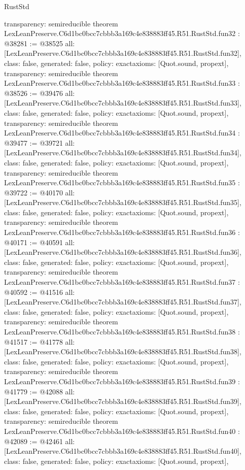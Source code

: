\begin{lexlean}{RustStd}
\begin{coremodule}
{  transparency: semireducible
}
theorem LexLeanPreserve.C6d1bc0bcc7cbbb3a169c4e838883ff45.R51.RustStd.fun32 : @38281 := @38525 {
  all: [LexLeanPreserve.C6d1bc0bcc7cbbb3a169c4e838883ff45.R51.RustStd.fun32],
  class: false,
  generated: false,
  policy: exact{axioms: [Quot.sound, propext]},
  transparency: semireducible
}
theorem LexLeanPreserve.C6d1bc0bcc7cbbb3a169c4e838883ff45.R51.RustStd.fun33 : @38526 := @39476 {
  all: [LexLeanPreserve.C6d1bc0bcc7cbbb3a169c4e838883ff45.R51.RustStd.fun33],
  class: false,
  generated: false,
  policy: exact{axioms: [Quot.sound, propext]},
  transparency: semireducible
}
theorem LexLeanPreserve.C6d1bc0bcc7cbbb3a169c4e838883ff45.R51.RustStd.fun34 : @39477 := @39721 {
  all: [LexLeanPreserve.C6d1bc0bcc7cbbb3a169c4e838883ff45.R51.RustStd.fun34],
  class: false,
  generated: false,
  policy: exact{axioms: [Quot.sound, propext]},
  transparency: semireducible
}
theorem LexLeanPreserve.C6d1bc0bcc7cbbb3a169c4e838883ff45.R51.RustStd.fun35 : @39722 := @40170 {
  all: [LexLeanPreserve.C6d1bc0bcc7cbbb3a169c4e838883ff45.R51.RustStd.fun35],
  class: false,
  generated: false,
  policy: exact{axioms: [Quot.sound, propext]},
  transparency: semireducible
}
theorem LexLeanPreserve.C6d1bc0bcc7cbbb3a169c4e838883ff45.R51.RustStd.fun36 : @40171 := @40591 {
  all: [LexLeanPreserve.C6d1bc0bcc7cbbb3a169c4e838883ff45.R51.RustStd.fun36],
  class: false,
  generated: false,
  policy: exact{axioms: [Quot.sound, propext]},
  transparency: semireducible
}
theorem LexLeanPreserve.C6d1bc0bcc7cbbb3a169c4e838883ff45.R51.RustStd.fun37 : @40592 := @41516 {
  all: [LexLeanPreserve.C6d1bc0bcc7cbbb3a169c4e838883ff45.R51.RustStd.fun37],
  class: false,
  generated: false,
  policy: exact{axioms: [Quot.sound, propext]},
  transparency: semireducible
}
theorem LexLeanPreserve.C6d1bc0bcc7cbbb3a169c4e838883ff45.R51.RustStd.fun38 : @41517 := @41778 {
  all: [LexLeanPreserve.C6d1bc0bcc7cbbb3a169c4e838883ff45.R51.RustStd.fun38],
  class: false,
  generated: false,
  policy: exact{axioms: [Quot.sound, propext]},
  transparency: semireducible
}
theorem LexLeanPreserve.C6d1bc0bcc7cbbb3a169c4e838883ff45.R51.RustStd.fun39 : @41779 := @42088 {
  all: [LexLeanPreserve.C6d1bc0bcc7cbbb3a169c4e838883ff45.R51.RustStd.fun39],
  class: false,
  generated: false,
  policy: exact{axioms: [Quot.sound, propext]},
  transparency: semireducible
}
theorem LexLeanPreserve.C6d1bc0bcc7cbbb3a169c4e838883ff45.R51.RustStd.fun40 : @42089 := @42461 {
  all: [LexLeanPreserve.C6d1bc0bcc7cbbb3a169c4e838883ff45.R51.RustStd.fun40],
  class: false,
  generated: false,
  policy: exact{axioms: [Quot.sound, propext]},
}
\end{coremodule}
\end{lexlean}
